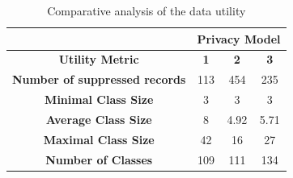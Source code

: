 \documentclass[a4paper, 11pt]{article}
\begin{document}
\begin{table}[H]
\centering
\begin{tabular}{c|ccc|}
\cline{2-4}
\textbf{}                                        & 
\multicolumn{3}{c|}{\textbf{Privacy Model}}                 \\ \hline
\multicolumn{1}{|c|}{\textbf{Utility Metric}}               & 
\multicolumn{1}{c|}{\textbf{1}} & \multicolumn{1}{c|}{\textbf{2}} & \textbf{3} 
\\ \hline
\multicolumn{1}{|c|}{\textbf{Number of suppressed records}} & 
\multicolumn{1}{c|}{113}        & \multicolumn{1}{c|}{454}        & 235        
\\ \hline
\multicolumn{1}{|c|}{\textbf{Minimal Class Size}} & \multicolumn{1}{c|}{3}   & 
\multicolumn{1}{c|}{3}    & 3    \\ \hline
\multicolumn{1}{|c|}{\textbf{Average Class Size}} & \multicolumn{1}{c|}{8}   & 
\multicolumn{1}{c|}{4.92} & 5.71 \\ \hline
\multicolumn{1}{|c|}{\textbf{Maximal Class Size}} & \multicolumn{1}{c|}{42}  & 
\multicolumn{1}{c|}{16}   & 27   \\ \hline
\multicolumn{1}{|c|}{\textbf{Number of Classes}}  & \multicolumn{1}{c|}{109} & 
\multicolumn{1}{c|}{111}  & 134  \\ \hline
\end{tabular}
\caption{Comparative analysis of the data utility}
\label{tab:comparative-analysis}
\end{table}

\vspace{\baselineskip}
\end{document}
